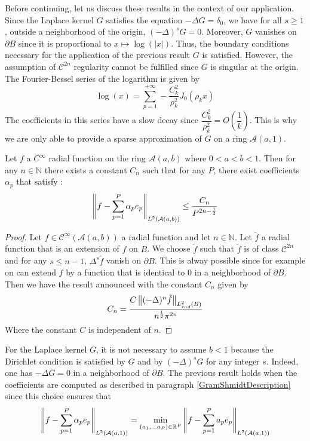 \documentclass[11pt,a4paper]{article}
\begin{document}
Before continuing, let us discuss these results in the context of our application. Since the Laplace kernel $G$ satisfies the equation $-\Delta G = \delta_0$, we have for all $s\geq 1$, outside a  neighborhood  of the origin, $(-\Delta)^s G =0$. Moreover, $G$ vanishes on $\partial B$ since it is proportional to $x \mapsto \log(|x|)$. Thus, the boundary conditions necessary for the application of the previous result $G$ is satisfied. However, the assumption of $\mathcal{C}^{2n}$ regularity cannot be fulfilled since $G$ is singular at the origin. The Fourier-Bessel series of the logarithm is given by 
\[ \log(x) = \sum_{p=1}^{+\infty} - \dfrac{C_k^2}{\rho_k^2} J_0(\rho_kx) \]
The coefficients in this series have a slow decay since $\dfrac{C_k^2}{\rho_k^2} = O\left(\dfrac{1}{k}\right)$. This is why we are only able to provide a sparse approximation of $G$ on a ring $\mathcal{A}(a,1)$.  
\begin{Prop} Let $f$ a $C^{\infty}$ radial function on the ring $\mathcal{A}(a,b)$ where $0<a<b<1$. Then for any $n \in \mathbb{N}$ there exists a constant $C_n$ such that for any $P$, there exist coefficients $\alpha_p$ that satisfy : 
\[ \left\|f - \sum_{p=1}^P \alpha_p e_p\right\|_{L^2(\mathcal{A}(a,b))} \leq \dfrac{C_n}{P^{2n - \frac{1}{2}}}\]
\begin{proof}
Let $f \in \mathcal{C}^{\infty}\left(\mathcal{A}(a,b)\right)$ a radial function and let $n \in \mathbb{N}$. Let $\tilde{f}$ a radial function that is an extension of $f$ on $B$. We choose $\tilde{f}$ such that $\tilde{f}$ is of class $\mathcal{C}^{2n}$ and for any $s \leq n-1$, $\Delta^s \tilde{f}$ vanish on $\partial B$. This is alway possible since for example on can extend $f$ by a function that is identical to 0 in a neighborhood of $\partial B$. Then we have the result announced with the constant $C_n$ given by \[C_n = \dfrac{C\left\|(-\Delta)^n \tilde{f}\right\|_{L^2_{rad}(B)}}{n^{\frac{1}{2}}\pi^{2n}}\]  
Where the constant $C$ is independent of $n$. 
\end{proof}
\end{Prop}

For the Laplace kernel $G$, it is not necessary to assume $b<1$ because the Dirichlet condition is satisfied by $G$ and by $(-\Delta)^s G$ for any integer $s$. Indeed, one has $-\Delta G = 0$ in a neighborhood of $\partial B$. The previous result holds when the coefficients are computed as described in paragraph \ref{GramShmidtDescription} since this choice ensures that 
\[ \left\|f - \sum_{p=1}^P{\alpha_p} e_p\right\|_{L^2(\mathcal{A}(a,1))} = \min_{(a_1,...a_P)\in\mathbb{R}^P}  \left\|f - \sum_{p=1}^P{a_p} e_p\right\|_{L^2(\mathcal{A}(a,1))}\]
\end{document}
